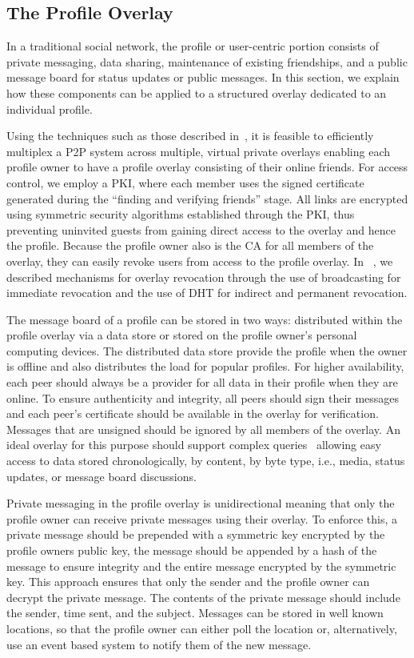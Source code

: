 \documentclass[letterpaper,twocolumn,10pt]{article}
\begin{document}
\subsection{The Profile Overlay}
\label{profile_overlay}
In a traditional social network, the profile or user-centric portion consists
of private messaging, data sharing, maintenance of existing friendships, and a
public message board for status updates or public messages.  In this
section, we explain how these components can be applied to a structured overlay
dedicated to an individual profile.

Using the techniques such as those described in~\cite{icdcs10}, it is feasible
to efficiently multiplex a P2P system across multiple, virtual private overlays enabling
each profile owner to have a profile overlay consisting of their online friends.
For access control, we employ a PKI, where each member uses the signed certificate
generated during the ``finding and verifying friends'' stage.  All links are
encrypted using symmetric security algorithms established through the PKI,
thus preventing uninvited guests from gaining direct access to the overlay and
hence the profile.  Because the profile owner also is the CA for all members of
the overlay, they can easily revoke users from access to the profile overlay.
In ~\cite{icdcs10}, we described mechanisms for overlay revocation through the
use of broadcasting for immediate revocation and the use of DHT for indirect
and permanent revocation.

The message board of a profile can be stored in two ways: distributed within the
profile overlay via a data store or stored on the profile owner's personal
computing devices.  The distributed data store provide the profile when the
owner is offline and also distributes the load for popular profiles.  For
higher availability, each peer should always be a provider for all data in their
profile when they are online.  To ensure authenticity and integrity, all peers
should sign their messages and each peer's certificate should be available in
the overlay for verification.  Messages that are unsigned should be ignored
by all members of the overlay.  An ideal overlay for this purpose should
support complex queries~\cite{complex_queries} allowing easy access to data
stored chronologically, by content, by byte type, i.e., media, status updates,
or message board discussions.

Private messaging in the profile overlay is unidirectional meaning that only
the profile owner can receive private messages using their overlay.  To
enforce this, a private message should be prepended with a symmetric key
encrypted by the profile owners public key, the message should be appended
by a hash of the message to ensure integrity and the entire message encrypted
by the symmetric key.  This approach ensures that only the sender and the
profile owner can decrypt the private message.  The contents of the private
message should include the sender, time sent, and the subject.  Messages can
be stored in well known locations, so that the profile owner can either poll
the location or, alternatively, use an event based system to notify them of
the new message.
\end{document}
